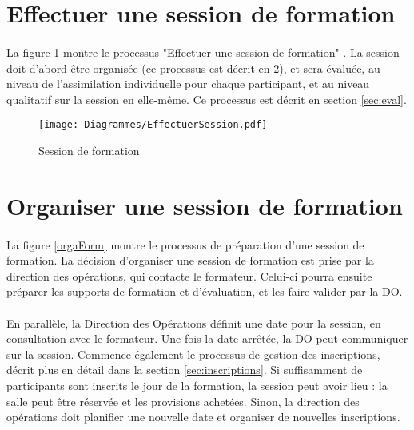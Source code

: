 \section{Effectuer une session de formation}
\paragraph{} La figure \ref{effSession} montre le processus "Effectuer une session de formation" . La session doit d'abord être organisée (ce processus est décrit en \ref{sec:Orga}), et sera évaluée, au niveau de l'assimilation individuelle pour chaque participant, et au niveau qualitatif sur la session en elle-même. Ce processus est décrit en section \ref{sec:eval}.

\begin{figure}[H]
	\centering
	\texttt{[image: Diagrammes/EffectuerSession.pdf]}
	\caption{Session de formation} 
	\label{effSession}
\end{figure}
 	



\section{Organiser une session de formation}
\label{sec:Orga}

\paragraph{}La figure \ref{orgaForm} montre le processus de préparation d'une session de formation. La décision d'organiser une session de formation est prise par la direction des opérations, qui contacte le formateur. Celui-ci pourra ensuite préparer les supports de formation et d'évaluation, et les faire valider par la DO.
\paragraph{} En parallèle, la Direction des Opérations définit une date pour la session, en consultation avec le formateur. Une fois la date arrêtée, la DO peut communiquer sur la session. Commence également le processus de gestion des inscriptions, décrit plus en détail dans la section \ref{sec:inscriptions}. Si suffisamment de participants sont inscrits le jour de la formation, la session peut avoir lieu : la salle peut être réservée et les provisions achetées. Sinon, la direction des opérations doit planifier une nouvelle date et organiser de nouvelles inscriptions.
